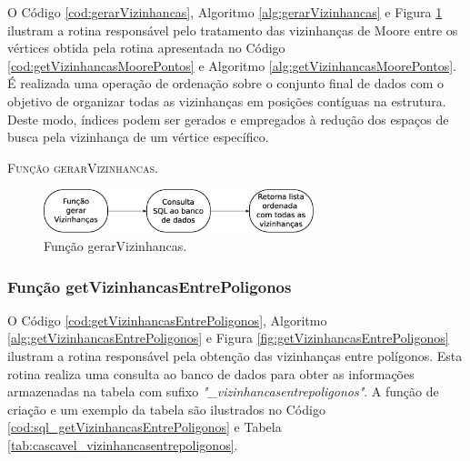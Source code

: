 O Código \ref{cod:gerarVizinhancas}, Algoritmo \ref{alg:gerarVizinhancas} e Figura \ref{fig:gerarVizinhancas} ilustram a rotina responsável pelo tratamento das vizinhanças de Moore entre os vértices obtida pela rotina apresentada no Código \ref{cod:getVizinhancasMoorePontos} e Algoritmo \ref{alg:getVizinhancasMoorePontos}. É realizada uma operação de ordenação sobre o conjunto final de dados com o objetivo de organizar todas as vizinhanças em posições contíguas na estrutura. Deste modo, índices podem ser gerados e empregados à redução dos espaços de busca pela vizinhança de um vértice específico. 



\begin{algorithm}[H]
   \SetAlgoLined   
   
   \caption{\textsc{Função gerarVizinhancas.}}
   \label{alg:gerarVizinhancas}
\end{algorithm}

\begin{figure}[H]
  \centering
  \includegraphics[width=0.7\textwidth]{Figuras/Simula/Fluxos/gerarVizinhancas.eps}
  \caption{Função gerarVizinhancas.}
  \label{fig:gerarVizinhancas}
\end{figure} 

\newpage

\subsubsection{Função getVizinhancasEntrePoligonos}

O Código \ref{cod:getVizinhancasEntrePoligonos}, Algoritmo \ref{alg:getVizinhancasEntrePoligonos} e Figura \ref{fig:getVizinhancasEntrePoligonos} ilustram a rotina responsável pela obtenção das vizinhanças entre polígonos. Esta rotina realiza uma consulta ao banco de dados para obter as informações armazenadas na tabela com sufixo \textit{"\_vizinhancasentrepoligonos"}. A função de criação e um exemplo da tabela são ilustrados no Código \ref{cod:sql_getVizinhancasEntrePoligonos} e Tabela \ref{tab:cascavel_vizinhancasentrepoligonos}. 



